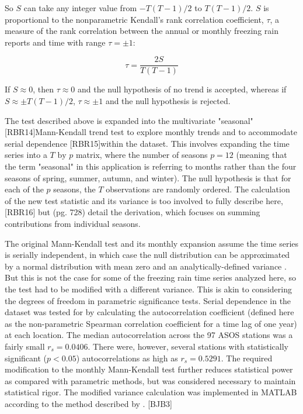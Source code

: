\documentclass[twocol]{ametsoc}
\begin{document}
So $S$ can take any integer value from $-T(T-1)/2$ to $T(T-1)/2$. $S$ is proportional to the nonparametric Kendall's rank correlation coefficient, $\tau$, a measure of the rank correlation between the annual or monthly freezing rain reports and time with range $\tau=\pm1$:



\[\tau=\frac{2S}{T(T-1)}\]



If $S\approx0$, then $\tau\approx0$ and the null hypothesis of no trend is accepted, whereas if  $S\approx\pm T(T-1)/2$, $\tau\approx\pm1$ and the null hypothesis is rejected. 



The test described above is expanded into the multivariate "seasonal" [RBR14]Mann-Kendall trend test to explore monthly trends and to accommodate serial dependence [RBR15]within the dataset. This involves expanding the time series into a $T\text{ by }p$ matrix, where the number of seasons $p=12$ (meaning that the term "seasonal" in this application is referring to months rather than the four seasons of spring, summer, autumn, and winter). The null hypothesis is that for each of the $p$ seasons, the $T$ observations are randomly ordered. The calculation of the new test statistic and its variance is too involved to fully describe here,[RBR16] but \citet{hirsch1984nonparametric} (pg. 728) detail the derivation, which focuses on summing contributions from individual seasons.



The original Mann-Kendall test and its monthly expansion assume the time series is serially independent, in which case the null distribution can be approximated by a normal distribution with mean zero and an analytically-defined variance \citep{kendall1955rank}. But this is not the case for some of the freezing rain time series analyzed here, so the test had to be modified with a different variance. This is akin to considering the degrees of freedom in parametric significance tests. Serial dependence in the dataset was tested for by calculating the autocorrelation coefficient (defined here as the non-parametric Spearman correlation coefficient for a time lag of one year) at each location. The median autocorrelation across the 97 ASOS stations was a fairly small $r_s = 0.0406$.  There were, however, several stations with statistically significant ($p<0.05$) autocorrelations as high as $r_s = 0.5291$. The required modification to the monthly Mann-Kendall test further reduces statistical power as compared with parametric methods, but was considered necessary to maintain statistical rigor. The modified variance calculation was implemented in MATLAB according to the method described by \citet{hirsch1984nonparametric}. [BJB3]
\end{document}
